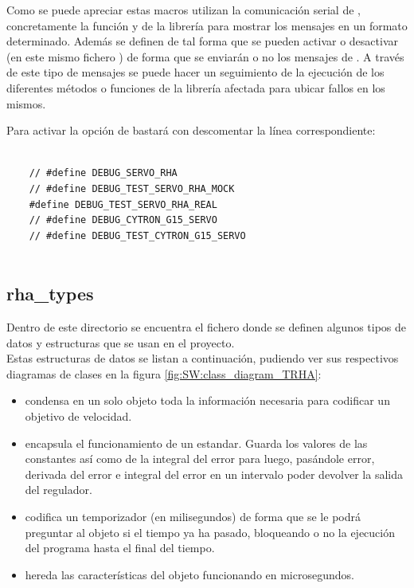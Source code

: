         Como se puede apreciar estas macros utilizan la comunicación serial de , concretamente la función  y  de la librería  para mostrar los mensajes en un formato determinado. Además se definen de tal forma que se pueden activar o desactivar (en este mismo fichero ) de forma que se enviarán o no los mensajes de . A través de este tipo de mensajes se puede hacer un seguimiento de la ejecución de los diferentes métodos o funciones de la librería afectada para ubicar fallos en los mismos.

        Para activar la opción de  bastará con descomentar la línea correspondiente:

        \lstset{language=C, breaklines=true, basicstyle=\footnotesize}
        \begin{lstlisting}[frame=single]
        
    // #define DEBUG_SERVO_RHA
    // #define DEBUG_TEST_SERVO_RHA_MOCK
    #define DEBUG_TEST_SERVO_RHA_REAL
    // #define DEBUG_CYTRON_G15_SERVO
    // #define DEBUG_TEST_CYTRON_G15_SERVO
            
        \end{lstlisting}
        
    \subsection{rha\_types} \label{subsec:SW:lib:rha_types}
        Dentro de este directorio se encuentra el fichero  donde se definen algunos tipos de datos y estructuras que se usan en el proyecto.
        \\
        
        Estas estructuras de datos se listan a continuación, pudiendo ver sus respectivos diagramas de clases en la figura \ref{fig:SW:class_diagram_TRHA}:
        
        \begin{itemize}
            \item {} condensa en un solo objeto toda la información necesaria para codificar un objetivo de velocidad.
            \item {} encapsula el funcionamiento de un  estandar. Guarda los valores de las constantes así como de la integral del error para luego, pasándole error, derivada del error e integral del error en un intervalo poder devolver la salida del regulador.
            \item {} codifica un temporizador (en milisegundos) de forma que se le podrá preguntar al objeto si el tiempo ya ha pasado, bloqueando o no la ejecución del programa hasta el final del tiempo.
            \item {} hereda las características del objeto  funcionando en microsegundos.
        
        \end{itemize}
        
